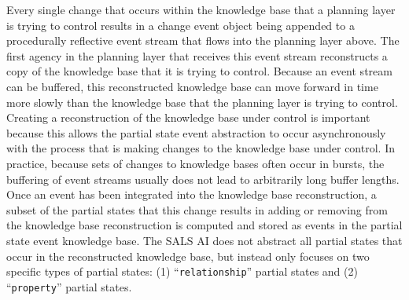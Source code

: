 Every single change that occurs within the knowledge base that a
planning layer is trying to control results in a change event object
being appended to a procedurally reflective event stream that flows
into the planning layer above.  The first agency in the planning layer
that receives this event stream reconstructs a copy of the knowledge
base that it is trying to control.  Because an event stream can be
buffered, this reconstructed knowledge base can move forward in time
more slowly than the knowledge base that the planning layer is trying
to control.  Creating a reconstruction of the knowledge base under
control is important because this allows the partial state event
abstraction to occur asynchronously with the process that is making
changes to the knowledge base under control.  In practice, because
sets of changes to knowledge bases often occur in bursts, the
buffering of event streams usually does not lead to arbitrarily long
buffer lengths.  Once an event has been integrated into the knowledge
base reconstruction, a subset of the partial states that this change
results in adding or removing from the knowledge base reconstruction
is computed and stored as events in the partial state event knowledge
base.  The SALS AI does not abstract all partial states that occur in
the reconstructed knowledge base, but instead only focuses on two
specific types of partial states: (1) ``{\tt{relationship}}'' partial
states and (2) ``{\tt{property}}'' partial states.

